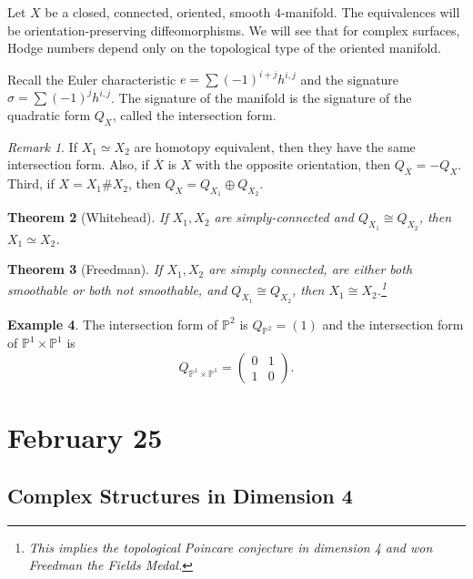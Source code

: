 \documentclass[leqno, openany]{memoir}
\newtheorem{thm}{Theorem}[chapter]
\theoremstyle{definition}
\newtheorem{exm}[thm]{Example}
\theoremstyle{remark}
\newtheorem{rmk}[thm]{Remark}
\theoremstyle{plain}
\theoremstyle{definition}
\theoremstyle{remark}
\renewcommand{\P}{\mathbb{P}}
\begin{document}
Let $X$ be a closed, connected, oriented, smooth $4$-manifold. The equivalences
will be orientation-preserving diffeomorphisms. We will see that for complex
surfaces, Hodge numbers depend only on the topological type of the oriented
manifold.

Recall the Euler characteristic $e = \sum (-1)^{i+j} h^{i,j}$ and the signature
$\sigma = \sum (-1)^j h^{i,j}$. The signature of the manifold is the signature
of the quadratic form $Q_X$, called the intersection form.

\begin{rmk} If $X_1 \simeq X_2$ are homotopy equivalent, then they have the
    same intersection form. Also, if $\overline{X}$ is $X$ with the opposite
    orientation, then $Q_{\overline{X}} = -Q_X$. Third, if $X = X_1 \# X_2$,
    then $Q_X = Q_{X_1} \oplus Q_{X_2}$.  \end{rmk}

\begin{thm}[Whitehead] If $X_1, X_2$ are simply-connected and $Q_{X_1} \cong
Q_{X_2}$, then $X_1 \simeq X_2$.  \end{thm}

\begin{thm}[Freedman] If $X_1, X_2$ are simply connected, are either both
    smoothable or both not smoothable, and $Q_{X_1} \cong Q_{X_2}$, then $X_1
    \cong X_2$.\footnote{This implies the topological Poincare conjecture in
    dimension 4 and won Freedman the Fields Medal.} \end{thm}

\begin{exm} The intersection form of $\P^2$ is $Q_{\P^2} = (1)$ and the
    intersection form of $\P^1 \times \P^1$ is \[Q_{\P^1 \times \P^1} =
        \begin{pmatrix} 0 & 1 \\ 1 & 0 \end{pmatrix}.\] \end{exm}

\chapter{February 25}%

\section{Complex Structures in Dimension 4}%
\label{sec:complex_structures_in_dimension_4_continued}
\end{document}
